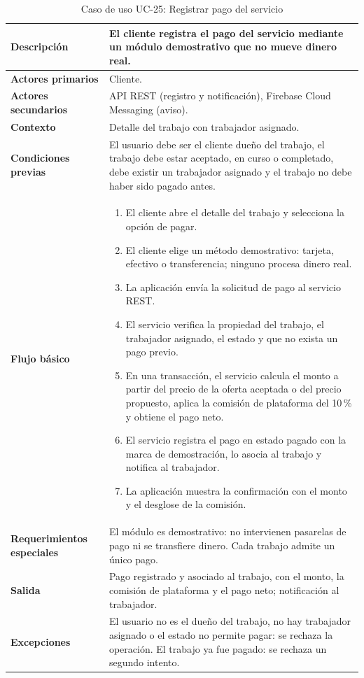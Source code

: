\documentclass[doc,12pt,a4paper]{apa7}
\begin{document}
\begin{longtable}{|P{3.3cm}|L{11.2cm}|}
\caption{Caso de uso UC-25: Registrar pago del servicio}\\
\hline
\textbf{Descripción} & El cliente registra el pago del servicio mediante un módulo demostrativo que no mueve dinero real. \\ \hline
\textbf{Actores primarios} & Cliente. \\ \hline
\textbf{Actores secundarios} & API REST (registro y notificación), Firebase Cloud Messaging (aviso). \\ \hline
\textbf{Contexto} & Detalle del trabajo con trabajador asignado. \\ \hline
\textbf{Condiciones previas} & El usuario debe ser el cliente dueño del trabajo, el trabajo debe estar aceptado, en curso o completado, debe existir un trabajador asignado y el trabajo no debe haber sido pagado antes. \\ \hline
\textbf{Flujo básico} &
\begin{enumerate}
    \item El cliente abre el detalle del trabajo y selecciona la opción de pagar.
    \item El cliente elige un método demostrativo: tarjeta, efectivo o transferencia; ninguno procesa dinero real.
    \item La aplicación envía la solicitud de pago al servicio REST.
    \item El servicio verifica la propiedad del trabajo, el trabajador asignado, el estado y que no exista un pago previo.
    \item En una transacción, el servicio calcula el monto a partir del precio de la oferta aceptada o del precio propuesto, aplica la comisión de plataforma del 10\,\% y obtiene el pago neto.
    \item El servicio registra el pago en estado pagado con la marca de demostración, lo asocia al trabajo y notifica al trabajador.
    \item La aplicación muestra la confirmación con el monto y el desglose de la comisión.
\end{enumerate} \\ \hline
\textbf{Requerimientos especiales} & El módulo es demostrativo: no intervienen pasarelas de pago ni se transfiere dinero. Cada trabajo admite un único pago. \\ \hline
\textbf{Salida} & Pago registrado y asociado al trabajo, con el monto, la comisión de plataforma y el pago neto; notificación al trabajador. \\ \hline
\textbf{Excepciones} & El usuario no es el dueño del trabajo, no hay trabajador asignado o el estado no permite pagar: se rechaza la operación. El trabajo ya fue pagado: se rechaza un segundo intento. \\ \hline
\end{longtable}
\end{document}
